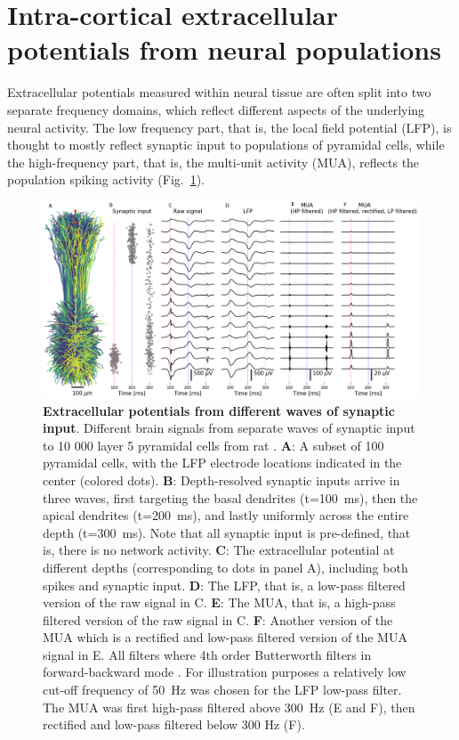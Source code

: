 \documentclass[preprint,11pt,authoryear]{elsarticle}
\begin{document}
\section{Intra-cortical extracellular potentials from neural populations}
Extracellular potentials measured within neural tissue are often split into two separate frequency domains, which reflect different aspects of the underlying neural activity. 
The low frequency part, that is, the local field potential (LFP), is thought to mostly reflect synaptic input to populations of pyramidal cells, while the high-frequency part, that is, the multi-unit activity (MUA), reflects the population spiking activity (Fig.~\ref{fig:LFP_MUA}).

\begin{figure}[!ht]
\begin{center}
\includegraphics[width=1\textwidth]{population_LFP_MUA.png}
\end{center}
\caption{\textbf{Extracellular potentials from different waves of synaptic input}. Different brain signals from separate waves of synaptic input to 10 000 layer 5 pyramidal cells from rat \citep{Hay2011}.
{\bf A}: A subset of 100 pyramidal cells, with the LFP electrode locations indicated in the center (colored dots).
{\bf B}: Depth-resolved synaptic inputs arrive in three waves, first targeting the basal dendrites (t=100~ms), then the apical dendrites (t=200~ms), and lastly uniformly across the entire depth (t=300~ms). Note that all synaptic input is pre-defined, that is, there is no network activity.
{\bf C}: The extracellular potential at different depths (corresponding to dots in panel A), including both spikes and synaptic input.
{\bf D}: The LFP, that is, a low-pass filtered version of the raw signal in C. 
{\bf E}: The MUA, that is, a high-pass filtered version of the raw signal in C.
{\bf F}: Another version of the MUA which is a rectified and low-pass filtered version of the MUA signal in E.
All filters where 4th order Butterworth filters in forward-backward mode \citep{NeuroEnsamble2017}. For illustration purposes a relatively low cut-off frequency of 50~Hz was chosen for the LFP low-pass filter. The MUA was first high-pass filtered above 300~Hz (E and F), then rectified and low-pass filtered below 300 Hz (F).
}
\label{fig:LFP_MUA}
\end{figure}
\end{document}
